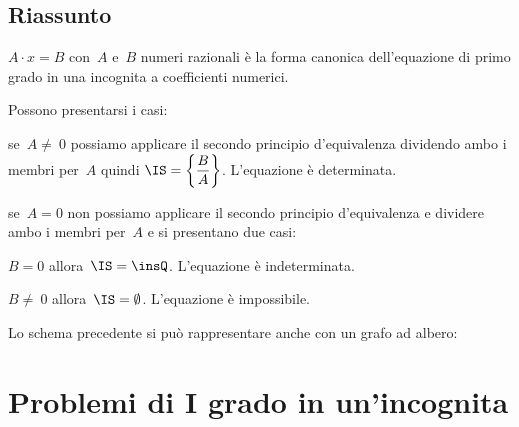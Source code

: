 
\subsection{Riassunto}
\(A\cdot x=B\) con~\(A\) e~\(B\) numeri
razionali è la forma canonica dell'equazione di primo grado in una
incognita a coefficienti numerici.%

Possono presentarsi i casi:
 \begin{itemize*}
 \item se~\(A\neq~0\) possiamo applicare il secondo principio
d'equivalenza dividendo ambo i membri per~\(A\) quindi
\(\IS =\left\{\dfrac{B}{A}\right\}\). L'equazione
è determinata.

 \item se~\(A=0\) non possiamo applicare il secondo principio
d'equivalenza e dividere ambo i membri per~\(A\) e si
presentano due casi:

\begin{itemize*}
 \item \(B=0\) allora~\(\IS =\insQ\). L'equazione
è indeterminata.

\item \(B\neq~0\) allora~\(\IS =\emptyset \).
L'equazione è impossibile.
\end{itemize*}


 \end{itemize*}

Lo schema precedente si può rappresentare anche con un grafo ad
albero:
\begin{center}
 
\end{center}





\section{Problemi di I grado in un'incognita}
\label{sec:equazioni_problemi}

